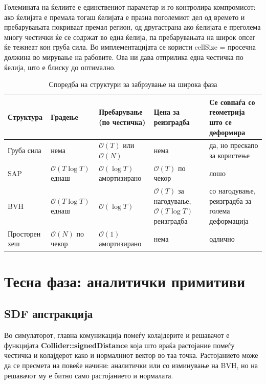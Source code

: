 Големината на ќелиите е единствениот параметар и го контролира компромисот: ако ќелијата е премала тогаш ќелијата е празна поголемиот дел од времето и пребарувањата покриваат премал регион, од другастрана ако ќелијата е преголема многу честички ќе се содржат во една ќелија, па пребарувањата на широк опсег ќе тежнеат кон груба сила. Во имплементацијата се користи cellSize = просечна должина во мирување на рабовите. Ова ни дава отприлика една честичка по ќелија, што е блиску до оптимално.

\begin{table}[h]
	\centering
	\small
	\caption{Споредба на структури за забрзување на широка фаза}
	\label{tab:broadphase-comparison}
	\begin{tabularx}{\textwidth}{l X X X X}
		\toprule
		\textbf{Структура} & \textbf{Градење} & \textbf{Пребарување (по честичка)} & \textbf{Цена за реизградба} & \textbf{Се совпаѓа со геометрија што се деформира} \\
		\midrule
		Груба сила
		& нема
		& $\mathcal{O}(T)$ или $\mathcal{O}(N)$
		& нема
		& да, но прескапо за користење \\
		\midrule
		SAP
		& $\mathcal{O}(T \log T)$ еднаш
		& $\mathcal{O}(\log T)$ амортизирано
		& $\mathcal{O}(T)$ по чекор
		& лошо \\
		\midrule
		BVH
		& $\mathcal{O}(T \log T)$ еднаш
		& $\mathcal{O}(\log T)$ 
		& $\mathcal{O}(T)$ за нагодување, $\mathcal{O}(T \log T)$ реизградба
		& со нагодување, реизградба за голема деформација\\
		\midrule
		Просторен хеш
		& $\mathcal{O}(N)$ по чекор
		& $\mathcal{O}(1)$ амортизирано
		& нема
		& одлично\\
		\bottomrule
	\end{tabularx}
\end{table}


\section{Тесна фаза: аналитички примитиви}
\subsection{SDF апстракција}
Во симулаторот, главна комуникација помеѓу колајдерите и решавачот е функцијата \textbf{Collider::signedDistance} која што враќа растојание помеѓу честичка и колајдерот како и нормалниот вектор во таа точка. Растојанието може да се пресмета на повеќе начини: аналитички или со изминување на BVH, но на решавачот му е битно само растојанието и нормалата.


